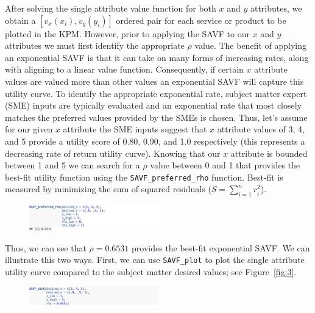 \documentclass[twocolumn]{svjour3}       %
\begin{document}
After solving the single attribute value function for both $x$ and $y$ attributes, we obtain a $\left[v_x\left(x_i\right), v_y\left(y_i\right)\right]$ ordered pair for each service or product to be plotted in the KPM.  However, prior to applying the SAVF to our $x$ and $y$ attributes we must first identify the appropriate $\rho$ value. The benefit of applying an exponential SAVF is that it can take on many forms of increasing rates, along with aligning to a linear value function. Consequently, if certain $x$ attribute values are valued more than other values an exponential SAVF will capture this utility curve. To identify the appropriate exponential rate, subject matter expert (SME) inputs are typically evaluated and an exponential rate that most closely matches the preferred values provided by the SMEs is chosen. Thus, let's assume for our given $x$ attribute the SME inputs suggest that $x$ attribute values of 3, 4, and 5 provide a utility score of 0.80, 0.90, and 1.0 respectively (this represents a decreasing rate of return utility curve). Knowing that our $x$ attribute is bounded between 1 and 5 we can search for a $\rho$ value between 0 and 1 that provides the best-fit utility function using the \texttt{SAVF\_preferred\_rho} function.  Best-fit is measured by minimizing the sum of squared residuals ($S = \sum_{i = 1}^n r_i ^ 2$).
\begin{figure}[!htb]
  \includegraphics[width=0.5\textwidth]{code5.png}
\end{figure}

Thus, we can see that $\rho = 0.6531$ provides the best-fit exponential SAVF. We can illustrate this two ways. First, we can use \texttt{SAVF\_plot} to plot the single attribute utility curve compared to the subject matter desired values; see Figure~\ref{fig:3}.
\begin{figure}[!htb]
  \includegraphics[width=0.5\textwidth]{code6.png}
\end{figure}
\end{document}
